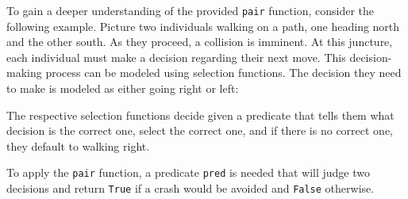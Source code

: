 \documentclass[runningheads]{llncs}
\begin{document}
To gain a deeper understanding of the provided \texttt{pair} function,
consider the following example. Picture two individuals walking on a
path, one heading north and the other south. As they proceed, a
collision is imminent. At this juncture, each individual must make a
decision regarding their next move. This decision-making process can be
modeled using selection functions. The decision they need to make is
modeled as either going right or left:

\begin{Shaded}
\begin{Highlighting}[]
  \OtherTok{=}  \OperatorTok{|} 
\end{Highlighting}
\end{Shaded}

The respective selection functions decide given a predicate that tells
them what decision is the correct one, select the correct one, and if
there is no correct one, they default to walking right.

\begin{Shaded}
\begin{Highlighting}[]
   
\OtherTok{=}     
\OtherTok{=}     
\end{Highlighting}
\end{Shaded}

To apply the \texttt{pair} function, a predicate \texttt{pred} is needed
that will judge two decisions and return \texttt{True} if a crash would
be avoided and \texttt{False} otherwise.

\begin{Shaded}
\begin{Highlighting}[]
\OtherTok{ ::}\NormalTok{ (}\NormalTok{, }\NormalTok{) }\OtherTok{{-}\textgreater{}} 
\NormalTok{ (}\NormalTok{,}\NormalTok{) }\OtherTok{=} 
\NormalTok{ (}\NormalTok{,}\NormalTok{) }\OtherTok{=} 
\NormalTok{ \_            }\OtherTok{=} 
\end{Highlighting}
\end{Shaded}
\end{document}
